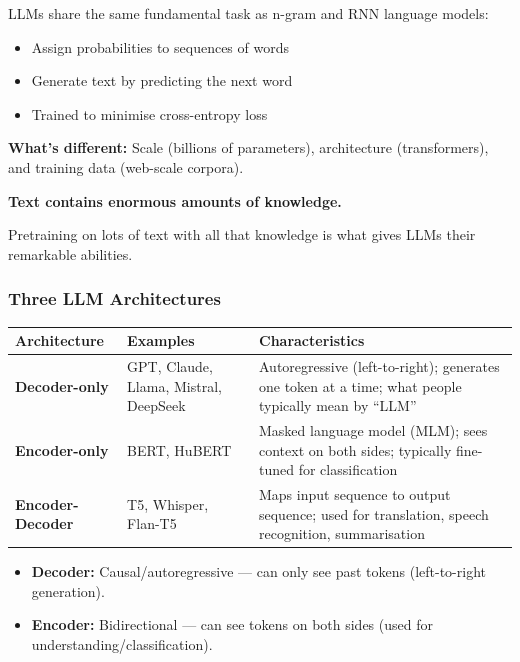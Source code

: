 \begin{keybox}
LLMs share the same fundamental task as n-gram and RNN language models:
\begin{itemize}
  \item Assign probabilities to sequences of words
  \item Generate text by predicting the next word
  \item Trained to minimise cross-entropy loss
\end{itemize}

\textbf{What's different:} Scale (billions of parameters), architecture (transformers), and training data (web-scale corpora).
\end{keybox}

\begin{tipbox}
\textbf{Text contains enormous amounts of knowledge.}

Pretraining on lots of text with all that knowledge is what gives LLMs their remarkable abilities.
\end{tipbox}

\bigseparator

\subsubsection{Three LLM Architectures}

\begin{center}
\renewcommand{\arraystretch}{1.4}
\begin{tabular}{@{} l p{4cm} p{5.5cm} @{}}
\toprule
\textbf{Architecture} & \textbf{Examples} & \textbf{Characteristics} \\
\midrule
\textbf{Decoder-only} & GPT, Claude, Llama, Mistral, DeepSeek & Autoregressive (left-to-right); generates one token at a time; what people typically mean by ``LLM'' \\
\textbf{Encoder-only} & BERT, HuBERT & Masked language model (MLM); sees context on both sides; typically fine-tuned for classification \\
\textbf{Encoder-Decoder} & T5, Whisper, Flan-T5 & Maps input sequence to output sequence; used for translation, speech recognition, summarisation \\
\bottomrule
\end{tabular}
\end{center}

\begin{tipbox}
\begin{itemize}
  \item \textbf{Decoder:} Causal/autoregressive --- can only see past tokens (left-to-right generation).
  \item \textbf{Encoder:} Bidirectional --- can see tokens on both sides (used for understanding/classification).
\end{itemize}
\end{tipbox}


